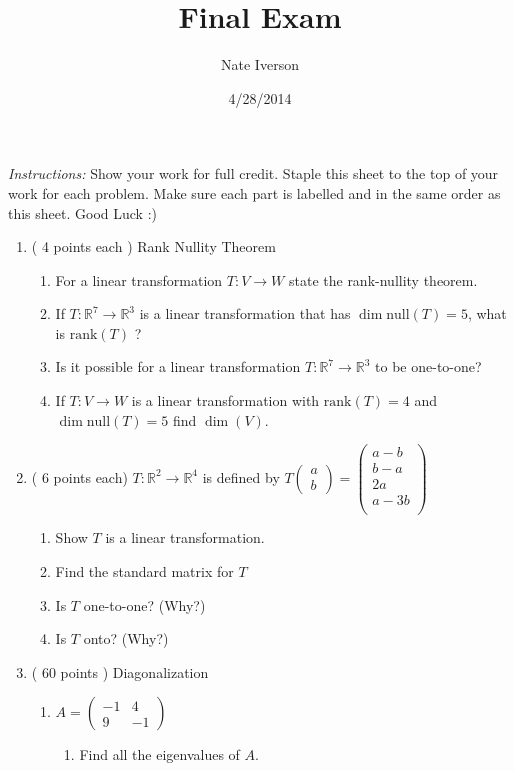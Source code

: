 \documentclass[12pt]{exam}
\title{Final Exam}
\author{Nate Iverson}
\date{4/28/2014}
\begin{document}
\maketitle
\emph{Instructions:} Show your work for full credit. Staple this sheet to the top of your work for each problem. Make sure each part is labelled and in the same order as this sheet. Good Luck :)

\begin{enumerate}
\item ( 4 points each ) Rank Nullity Theorem
\begin{enumerate}
\item For a linear transformation $T:V \to W$ state the rank-nullity theorem.
\item If $T:\mathbb{R}^7 \to \mathbb{R}^3$ is a linear transformation that has $\dim \text{null}(T)=5$, what is  $\text{rank}(T)$ ?
\item Is it possible for a linear transformation  $T:\mathbb{R}^7 \to \mathbb{R}^3$ to be one-to-one?
\item If $T:V\to W$ is a linear transformation with $\text{rank}(T)=4$ and $\dim \text{null}(T)=5$ find $\dim(V)$.
\end{enumerate}
\item ( 6 points each) $T:\mathbb{R}^2\to \mathbb{R}^4$ is defined by
$T\begin{pmatrix}a\\b\end{pmatrix}=
\begin{pmatrix} 
a-b\\
b-a\\
2a\\
a-3b\\
\end{pmatrix}$
\begin{enumerate}
\item Show $T$ is a linear transformation.
\item Find the standard matrix for $T$
\item Is $T$ one-to-one? (Why?)
\item Is $T$ onto? (Why?)
\end{enumerate}
\item ( 60 points ) Diagonalization
\begin{enumerate}
\item $A=\left(\begin{array}{rr}
-1 & 4 \\ 9 & -1
\end{array}\right)$
\begin{enumerate}
\item Find all the eigenvalues of $A$.


\end{enumerate}
\end{enumerate}
\end{enumerate}
\end{document}
